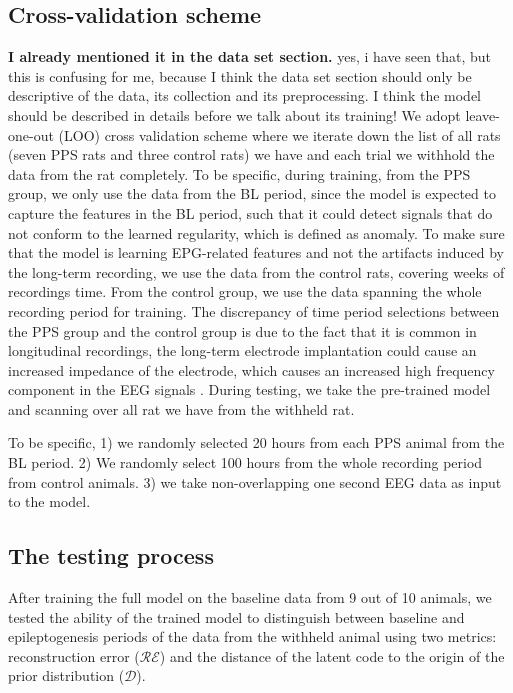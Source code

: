 \documentclass[pmlr]{jmlr}%
\begin{document}
\subsection{Cross-validation scheme}
\textbf{I already mentioned it in the data set section.}
yes, i have seen that, but this is confusing for me, because  I think the data set section should only be descriptive of the data, its collection and its preprocessing. I think the model should be described in details before we talk about its training! 
We adopt leave-one-out (LOO) cross validation scheme where we iterate down the list of all rats (seven PPS rats and three control rats) we have and each trial we withhold the data from the rat completely. To be specific, during training, from the PPS group, we only use the data from the BL period, since the model is expected to capture the features in the BL period, such that it could detect signals that do not conform to the learned regularity, which is defined as anomaly. 
To make sure that the model is learning EPG-related features and not the artifacts induced by the long-term recording, we use the data from the control rats, covering weeks of recordings time.   
From the control group, we use the data spanning the whole recording period for training. The discrepancy of time period selections between the PPS group and the control group is due to the fact that it is common in longitudinal recordings, the long-term electrode implantation could cause an increased impedance of the electrode, which causes an increased high frequency component in the EEG signals \cite{straka2018characterizing}. During testing, we take the pre-trained model and scanning over all rat we have from the withheld rat.

To be specific, 1) we randomly selected 20 hours from each PPS animal from the BL period. 2) We randomly select 100 hours from the whole recording period from control animals. 3) we take non-overlapping one second EEG data as input to the model.



\subsection{The testing process}
After training the full model on the baseline data from 9 out of 10 animals, we tested the ability of the trained model to distinguish between baseline and epileptogenesis periods of the data from the withheld animal using two metrics: reconstruction error ($\mathcal{RE}$) and the distance of the latent code to the origin of the prior distribution ($\mathcal{D}$). 
\end{document}
